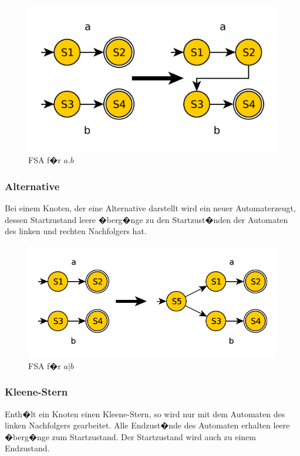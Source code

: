 \begin{figure}[h]
  \begin{center}
  \includegraphics{objectsToInclude/re_fsa_aANDb.pdf}
  \caption{FSA f�r $a.b$}
  \label{fig:Konkatenation}
  \end{center}
\end{figure}

\subsubsection{Alternative}
Bei einem Knoten, der eine
Alternative darstellt wird ein neuer
Automaterzeugt, dessen
Startzustand leere �berg�nge zu den
Startzust�nden der Automaten des
linken und rechten Nachfolgers hat.

\begin{figure}[h]
  \begin{center}
  \includegraphics{objectsToInclude/re_fsa_aOrb.pdf}
  \caption{FSA f�r $a|b$}
  \label{fig:Alternative1}
  \end{center}
\end{figure}

\subsubsection{Kleene-Stern}
Enth�lt ein Knoten einen Kleene-Stern, so wird nur mit dem Automaten des linken
Nachfolgers gearbeitet. Alle Endzust�nde des Automaten erhalten leere �berg�nge
zum Startzustand. Der Startzustand wird auch zu einem Endzustand.

